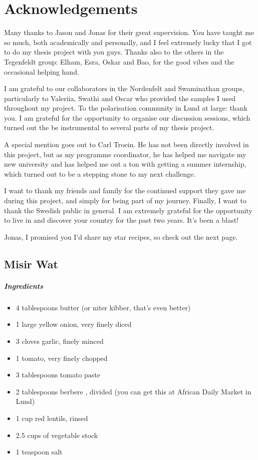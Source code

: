 \chapter{Acknowledgements}

Many thanks to Jason and Jonas for their great supervision. You have taught me so much, both academically and personally, and I feel extremely lucky that I got to do my thesis project with you guys. Thanks also to the others in the Tegenfeldt group: Elham, Esra, Oskar and Bao, for the good vibes and the occasional helping hand.

I am grateful to our collaborators in the Nordenfelt and Swaminathan groups, particularly to Valeriia, Swathi and Oscar who provided the samples I used throughout my project. To the polarisation community in Lund at large: thank you. I am grateful for the opportunity to organise our discussion sessions, which turned out the be instrumental to several parts of my thesis project.

A special mention goes out to Carl Troein. He has not been directly involved in this project, but as my programme coordinator, he has helped me navigate my new university and has helped me out a ton with getting a summer internship, which turned out to be a stepping stone to my next challenge.

I want to thank my friends and family for the continued support they gave me during this project, and simply for being part of my journey. Finally, I want to thank the Swedish public in general. I am extremely grateful for the opportunity to live in and discover your country for the past two years. It's been a blast!

\bigskip

\noindent Jonas, I promised you I'd share my star recipes, so check out the next page.
\newpage
\section*{Misir Wat}
\paragraph{Ingredients}
\begin{itemize}
	\item 4 tablespoons butter (or niter kibber, that's even better)
	\item 1 large yellow onion, very finely diced
	\item 3 cloves garlic, finely minced
	\item 1 tomato, very finely chopped
	\item 3 tablespoons tomato paste
	\item 2 tablespoons berbere , divided (you can get this at African Daily Market in Lund)
	\item 1 cup red lentils, rinsed
	\item 2.5 cups of vegetable stock
	\item 1 teaspoon salt
\end{itemize}

